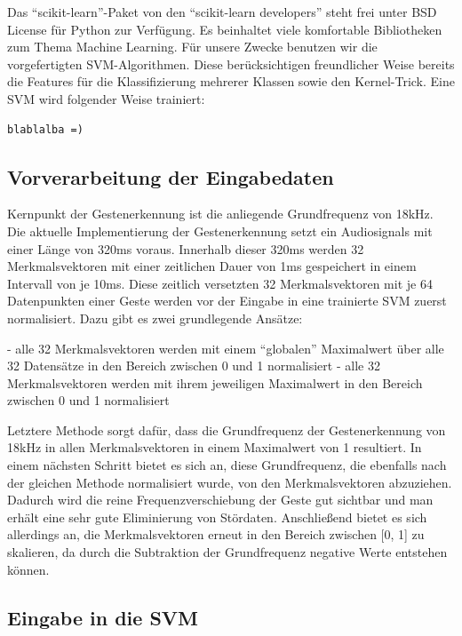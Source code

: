 Das “scikit-learn”-Paket von den “scikit-learn developers” steht frei unter BSD License für Python zur Verfügung. Es beinhaltet viele komfortable Bibliotheken zum Thema Machine Learning. Für unsere Zwecke benutzen wir die vorgefertigten SVM-Algorithmen. Diese berücksichtigen freundlicher Weise bereits die Features für die Klassifizierung mehrerer Klassen sowie den Kernel-Trick. Eine SVM wird folgender Weise trainiert:

\begin{lstlisting}
blablalba =)
\end{lstlisting}


\subsection{Vorverarbeitung der Eingabedaten}

Kernpunkt der Gestenerkennung ist die anliegende Grundfrequenz von 18kHz. Die aktuelle Implementierung der Gestenerkennung setzt ein Audiosignals mit einer Länge von 320ms voraus. Innerhalb dieser 320ms werden 32 Merkmalsvektoren mit einer zeitlichen Dauer von 1ms gespeichert in einem Intervall von je 10ms. Diese zeitlich versetzten 32 Merkmalsvektoren mit je 64 Datenpunkten einer Geste werden vor der Eingabe in eine trainierte SVM zuerst normalisiert. Dazu gibt es zwei grundlegende Ansätze:

- alle 32 Merkmalsvektoren werden mit einem “globalen” Maximalwert über alle 32 Datensätze in den Bereich zwischen 0 und 1 normalisiert\newline
- alle 32 Merkmalsvektoren werden mit ihrem jeweiligen Maximalwert in den Bereich zwischen 0 und 1 normalisiert

Letztere Methode sorgt dafür, dass die Grundfrequenz der Gestenerkennung von 18kHz in allen Merkmalsvektoren in einem Maximalwert von 1 resultiert. In einem nächsten Schritt bietet es sich an, diese Grundfrequenz, die ebenfalls nach der gleichen Methode normalisiert wurde, von den Merkmalsvektoren abzuziehen. Dadurch wird die reine Frequenzverschiebung der Geste gut sichtbar und man erhält eine sehr gute Eliminierung von Stördaten. Anschließend bietet es sich allerdings an, die Merkmalsvektoren erneut in den Bereich zwischen [0, 1] zu skalieren, da durch die Subtraktion der Grundfrequenz negative Werte entstehen können.


\subsection{Eingabe in die SVM}


